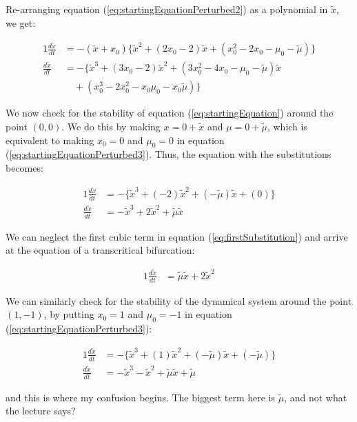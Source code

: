 \documentclass{article}
\begin{document}
Re-arranging equation (\ref{eq:startingEquationPerturbed2}) as a polynomial in $\tilde{x}$, we get:

	\begin{alignat}{1}
		\label{eq:startingEquationPerturbed3}
		\frac{d\tilde{x}}{dt} &= -(\tilde{x}+x_0)\{\tilde{x}^2 + (2x_0-2)\tilde{x} + (x_0^2-2x_0-\mu_0-\tilde{\mu})\} \nonumber \\		
		\frac{d\tilde{x}}{dt} &= -\{\tilde{x}^3 + (3x_0-2)\tilde{x}^2 + (3x_0^2-4x_0-\mu_0-\tilde{\mu})\tilde{x} \\&{\hspace{12pt}}   +(x_0^3 -2x_0^2 -x_0\mu_0 -x_0\tilde{\mu})\} \nonumber
	\end{alignat}	
	
	We now check for the stability of equation (\ref{eq:startingEquation}) around the point $(0,0)$. We do this by making $x = 0 + \tilde{x}$ and $\mu = 0 + \tilde{\mu}$, which is equivalent to making $x_0 = 0$ and $\mu_0 = 0$ in equation (\ref{eq:startingEquationPerturbed3}). Thus, the equation with the substitutions becomes:
	
	\begin{alignat}{1}
		\label{eq:firstSubstitution}
		\frac{d\tilde x}{dt} &= -\{\tilde{x}^3 + (-2)\tilde{x}^2 + (-\tilde{\mu})\tilde{x} +(0)\} \nonumber \\
		 \frac{d\tilde x}{dt} &= -\tilde{x}^3 + 2\tilde{x}^2 + \tilde{\mu}\tilde{x}
	\end{alignat}
	
	We can neglect the first cubic term in equation (\ref{eq:firstSubstitution}) and arrive at the equation of a transcritical bifurcation:
	
	\begin{alignat}{1}
		\frac{d\tilde{x}}{dt} &= \tilde{\mu}\tilde{x} + 2\tilde{x}^2
	\end{alignat}
	
	We can similarly check for the stability of the dynamical system around the point $(1,-1)$, by putting $x_0 = 1$ and $\mu_0 = -1$ in equation (\ref{eq:startingEquationPerturbed3}):
	
	\begin{alignat}{1}
		\frac{d\tilde{x}}{dt} &= -\{\tilde{x}^3 + (1)\tilde{x}^2 + (-\tilde{\mu})\tilde{x} + (-\tilde{\mu})\} \nonumber \\
		\frac{d\tilde{x}}{dt} &=  -\tilde{x}^3 - \tilde{x}^2 + \tilde{\mu}\tilde{x} + \tilde{\mu}
	\end{alignat}

	and this is where my confusion begins. The biggest term here is $\tilde{\mu}$, and not what the lecture says?
\end{document}
